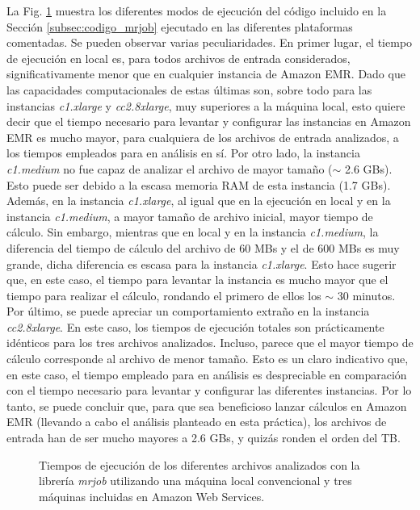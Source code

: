 \documentclass[10pt, spanish]{article}
\begin{document}
La Fig. \ref{fig:TotalMrjob} muestra los diferentes modos de ejecución del código incluido en la Sección \ref{subsec:codigo_mrjob} ejecutado en las diferentes plataformas comentadas. Se pueden observar varias peculiaridades. En primer lugar, el tiempo de ejecución en local es, para todos archivos de entrada considerados, significativamente menor que en cualquier instancia de Amazon EMR. Dado que las capacidades computacionales de estas últimas son, sobre todo para las instancias \textit{c1.xlarge} y \textit{cc2.8xlarge}, muy superiores a la máquina local, esto quiere decir que el tiempo necesario para levantar y configurar las instancias en Amazon EMR es mucho mayor, para cualquiera de los archivos de entrada analizados, a los tiempos empleados para en análisis en sí. Por otro lado, la instancia \textit{c1.medium} no fue capaz de analizar el archivo de mayor tamaño ($\sim$ 2.6 GBs). Esto puede ser debido a la escasa memoria RAM de esta instancia (1.7 GBs). Además, en la instancia \textit{c1.xlarge}, al igual que en la ejecución en local y en la instancia \textit{c1.medium}, a mayor tamaño de archivo inicial, mayor tiempo de cálculo. Sin embargo, mientras que en local y en la instancia \textit{c1.medium}, la diferencia del tiempo de cálculo del archivo de 60 MBs y el de 600 MBs es muy grande, dicha diferencia es escasa para la instancia \textit{c1.xlarge}. Esto hace sugerir que, en este caso, el tiempo para levantar la instancia es mucho mayor que el tiempo para realizar el cálculo, rondando el primero de ellos los $\sim$ 30 minutos. Por último, se puede apreciar un comportamiento extraño en la instancia \textit{cc2.8xlarge}. En este caso, los tiempos de ejecución totales son prácticamente idénticos para los tres archivos analizados. Incluso, parece que el mayor tiempo de cálculo corresponde al archivo de menor tamaño. Esto es un claro indicativo que, en este caso, el tiempo empleado para en análisis es despreciable en comparación con el tiempo necesario para levantar y configurar las diferentes instancias. Por lo tanto, se puede concluir que, para que sea beneficioso lanzar cálculos en Amazon EMR (llevando a cabo el análisis planteado en esta práctica), los archivos de entrada han de ser mucho mayores a 2.6 GBs, y quizás ronden el orden del TB.

\begin{figure}[H]
\begin{center}
\caption{\label{fig:TotalMrjob}Tiempos de ejecución de los diferentes archivos analizados con la librería \textit{mrjob} utilizando una máquina local convencional y tres máquinas incluidas en Amazon Web Services.}
\end{center}
\end{figure}
\end{document}

